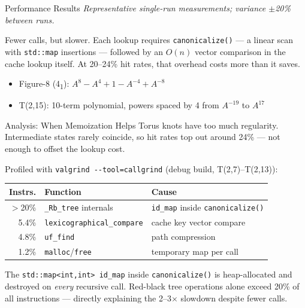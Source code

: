 \documentclass[final]{beamer}
\newlength{\colwidth}
\begin{document}
\begin{frame}[t,fragile]
\begin{columns}[t]
\begin{column}{\colwidth}
\begin{block}{Performance Results}
    \textit{Representative single-run measurements; variance $\pm$20\% between runs.}

    \vspace{0.1cm}
    Fewer calls, but slower. Each lookup requires \texttt{canonicalize()} --- a linear scan with \texttt{std::map} insertions --- followed by an $O(n)$ vector comparison in the cache lookup itself. At 20--24\% hit rates, that overhead costs more than it saves.

    \vspace{0.1cm}
    \begin{itemize}\setlength\itemsep{0pt}
      \item Figure-8 (4\textsubscript{1}): $A^8 - A^4 + 1 - A^{-4} + A^{-8}$ \checkmark
      \item T(2,15): 10-term polynomial, powers spaced by 4 from $A^{-19}$ to $A^{17}$ \checkmark
    \end{itemize}
  \end{block}

  \begin{block}{Analysis: When Memoization Helps}
    Torus knots have too much regularity. Intermediate states rarely coincide, so hit rates top out around 24\% --- not enough to offset the lookup cost.

    \vspace{0.1cm}

    Profiled with \texttt{valgrind -{}-tool=callgrind} (debug build, T(2,7)--T(2,13)):

    \begin{center}
    \begin{tabular}{rll}
    \toprule
    \textbf{Instrs.} & \textbf{Function} & \textbf{Cause} \\
    \midrule
    $>$20\% & \texttt{\_Rb\_tree} internals & \texttt{id\_map} inside \texttt{canonicalize()} \\
    5.4\%   & \texttt{lexicographical\_compare} & cache key vector compare \\
    4.8\%   & \texttt{uf\_find} & path compression \\
    1.2\%   & \texttt{malloc}/\texttt{free} & temporary map per call \\
    \bottomrule
    \end{tabular}
    \end{center}

    \vspace{0.05cm}
    The \texttt{std::map<int,int> id\_map} inside \texttt{canonicalize()} is heap-allocated and destroyed on \emph{every} recursive call. Red-black tree operations alone exceed 20\% of all instructions --- directly explaining the 2--3$\times$ slowdown despite fewer calls.


\end{block}
\end{column}
\end{columns}
\end{frame}
\end{document}

